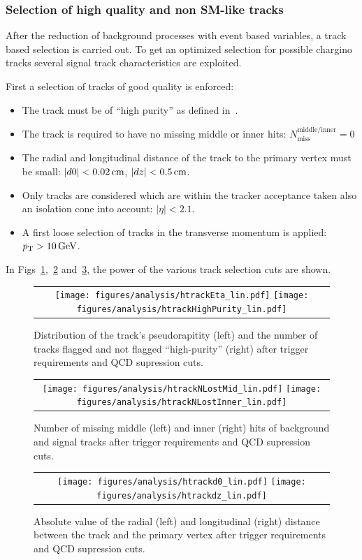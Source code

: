 \subsubsection*{Selection of high quality and non SM-like tracks}
After the reduction of background processes with event based variables, a track based selection is carried out.
To get an optimized selection for possible chargino tracks several signal track characteristics are exploited.

First a selection of tracks of good quality is enforced:
\begin{itemize}
\renewcommand{\labelitemi}{\footnotesize{\ding{118}}}
\item The track must be of ``high purity'' as defined in~\cite{bib:CMS:Tracking_2010}.
\item The track is required to have no missing middle or inner hits: $N_{\text{miss}}^{\text{middle/inner}}=0$
\item The radial and longitudinal  distance of the track to the primary vertex must be small: \mbox{$|d0|<0.02\,\text{cm}$}, \mbox{$|dz|<0.5\,\text{cm}$}.
\item Only tracks are considered which are within the tracker acceptance taken also an isolation cone into account: $|\eta|<2.1$.
\item A first loose selection of tracks in the transverse momentum is applied: \mbox{$p_{\text{T}}>10\,\text{Ge}\kern-0.06667em\text{V}$}.
\end{itemize}
In Figs~\ref{fig:Eta_HighPurity},~\ref{fig:LostHits} and~\ref{fig:d0_dz}, the power of the various track selection cuts are shown.\\
\begin{figure}[!t]
  \centering 
  \begin{tabular}{c}
    \texttt{[image: figures/analysis/htrackEta\_lin.pdf]}
    \texttt{[image: figures/analysis/htrackHighPurity\_lin.pdf]}
  \end{tabular}
  \caption{Distribution of the track's pseudorapitity (left) and the number of tracks flagged and not flagged ``high-purity'' (right) after trigger requirements and QCD supression cuts.}
  \label{fig:Eta_HighPurity}
\end{figure}
\begin{figure}[!t]
  \centering 
  \begin{tabular}{c}
    \texttt{[image: figures/analysis/htrackNLostMid\_lin.pdf]}
    \texttt{[image: figures/analysis/htrackNLostInner\_lin.pdf]}
  \end{tabular}
  \caption{Number of missing middle (left) and inner (right) hits of background and signal tracks after trigger requirements and QCD supression cuts.}
  \label{fig:LostHits}
\end{figure}
\begin{figure}[!t]
  \centering 
  \begin{tabular}{c}
    \texttt{[image: figures/analysis/htrackd0\_lin.pdf]}
    \texttt{[image: figures/analysis/htrackdz\_lin.pdf]}
  \end{tabular}
  \caption{Absolute value of the radial (left) and longitudinal (right) distance between the track and the primary vertex after trigger requirements and QCD supression cuts.}
  \label{fig:d0_dz}
\end{figure}

